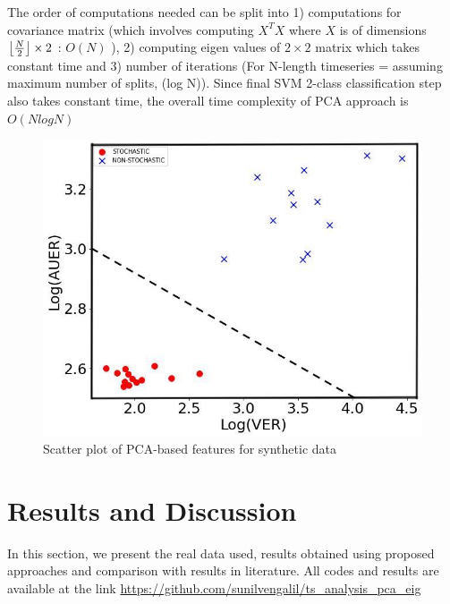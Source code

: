 \documentclass[journal]{IEEEtran}
\DeclarePairedDelimiter\floor{\lfloor}{\rfloor}
\begin{document}
	The order of computations needed can be split into 1) computations for covariance matrix (which involves computing $X^TX$  where $X$ is of dimensions $ {\floor*{\frac{N}{2}}} \times 2$ : $O(N)$ ), 2) computing eigen values of $2\times 2$ matrix which takes constant time and 3) number of iterations  (For N-length timeseries = assuming maximum number of splits, (log N)). Since final SVM 2-class classification step also takes constant time, the overall time complexity of PCA approach is $O(NlogN)$
	\begin{figure}[h]
		\centering
		\includegraphics[width=0.7\linewidth]{Scatterplot_poc_variance_area_threshold_7.jpg}
		\caption{Scatter plot of PCA-based features for synthetic data}
		\label{scatterplot}
	\end{figure}
	
	
	
	\section{Results and Discussion} \label{rnd}
	In this section, we present the real data used, results obtained using proposed approaches and comparison with results in literature. All codes and results are available at the link \href{https://github.com/sunilvengalil/ts_analysis_pca_eig}{https://github.com/sunilvengalil/ts\_analysis\_pca\_eig}
	
\end{document}
